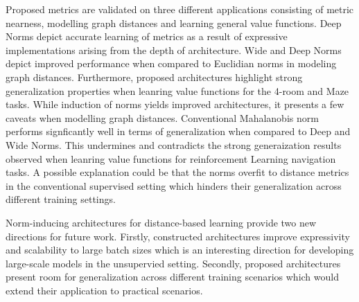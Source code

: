 \documentclass[11pt,letterpaper]{article}
\begin{document}
Proposed metrics are validated on three different applications consisting of metric nearness, modelling graph distances and learning general value functions. Deep Norms depict accurate learning of metrics as a result of expressive implementations arising from the depth of architecture. Wide and Deep Norms depict improved performance when compared to Euclidian norms in modeling graph distances. Furthermore, proposed architectures highlight strong generalization properties when leanring value functions for the 4-room and Maze tasks. While induction of norms yields improved architectures, it presents a few caveats when modelling graph distances. Conventional Mahalanobis norm performs signficantly well in terms of generalization when compared to Deep and Wide Norms. This undermines and contradicts the strong generaization results observed when leanring value functions for reinforcement Learning navigation tasks. A possible explanation could be that the norms overfit to distance metrics in the conventional supervised setting which hinders their generalization across different training settings. 

Norm-inducing architectures for distance-based learning provide two new directions for future work. Firstly, constructed architectures improve expressivity and scalability to large batch sizes which is an interesting direction for developing large-scale models in the unsupervied setting. Secondly, proposed architectures present room for generalization across different training scenarios which would extend their application to practical scenarios. 
\end{document}
